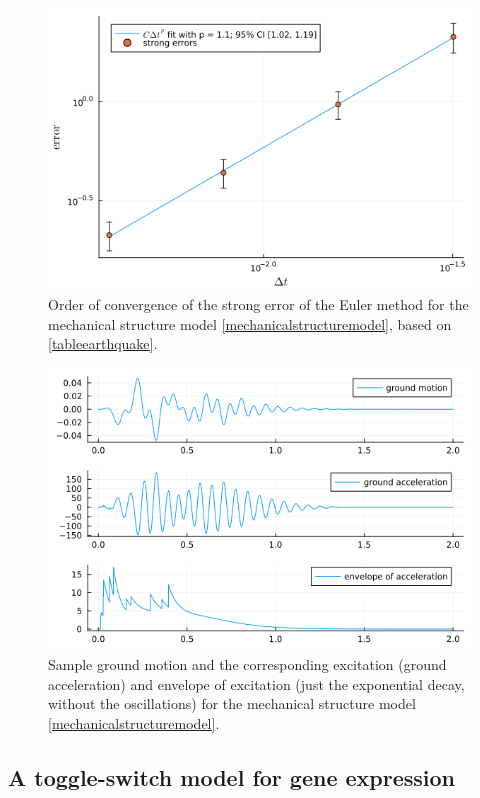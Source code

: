 \documentclass[reqno,12pt]{amsart}
\theoremstyle{plain} %
\theoremstyle{definition} %
\begin{document}
\begin{figure}[htb]
    \includegraphics[scale=0.6]{img/convergence_earthquake.png}
    \caption{Order of convergence of the strong error of the Euler method for the mechanical structure model \eqref{mechanicalstructuremodel}, based on \cref{tableearthquake}.}
    \label{figearthquake}
\end{figure}

\begin{figure}[htb]
    \includegraphics[scale=0.6]{img/noise_earthquake.png}
    \caption{Sample ground motion and the corresponding excitation (ground acceleration) and envelope of excitation (just the exponential decay, without the oscillations) for the mechanical structure model \eqref{mechanicalstructuremodel}.}
    \label{figearthquakenoise}
\end{figure}

\subsection{A toggle-switch model for gene expression}
\end{document}
